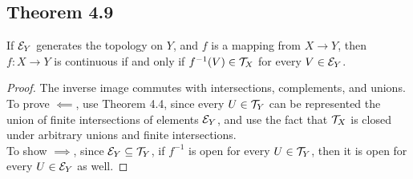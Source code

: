 \documentclass[../../main.tex]{subfiles}
\begin{document}
\subsection{Theorem 4.9}
\begin{wts}
    If $\mathcal{E}_Y$ generates the topology on $Y$, and $f$ is a mapping from $X\to Y$, then $f:X\to Y$ is continuous if and only if $f^{-1}(V)\in \mathcal{T}_X$ for every $V\in \mathcal{E}_Y$.
\end{wts}
\begin{proof}
    The inverse image commutes with intersections, complements, and unions. To prove $\impliedby$, use Theorem 4.4, since every $U\in \mathcal{T}_Y$ can be represented the union of finite intersections of elements $\mathcal{E}_Y$, and use the fact that $\mathcal{T}_X$ is closed under arbitrary unions and finite intersections.\\
    
    To show $\implies$, since $\mathcal{E}_Y\subseteq \mathcal{T}_Y$, if $f^{-1}$ is open for every $U\in\mathcal{T}_Y$, then it is open for every $U\in \mathcal{E}_Y$ as well.
\end{proof}
\end{document}

